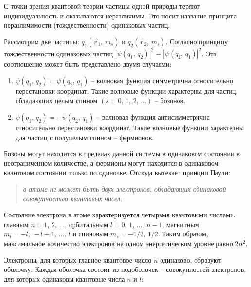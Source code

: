 
С точки зрения квантовой теории частицы одной природы теряют индивидуальность и
оказываются неразличимы. Это носит название принципа неразличимости
(тождественности) одинаковых частиц.

Рассмотрим две частицы: \( q_1(\vec{r}_1,\,m_s) \) и \( q_2(\vec{r}_2,\,
m_s) \). Согласно принципу тождественности одинаковых частиц
\( |\psi(q_1,\,q_2)|^2 = |\psi(q_2,\,q_1)|^2 \). Это соотношение может быть
представлено двумя случаями:
\begin{enumerate}
    \item \( \psi(q_1,\,q_2) = \psi(q_2,\,q_1) \) -- волновая функция
    симметрична относительно перестановки координат. Такие волновые функции
    характерны для частиц, обладающих целым спином \( (s = 0,\,1,\,2,\,\ldots)
    \) -- бозонов.
    
    \item \( \psi(q_1,\,q_2) = -\psi(q_2,\,q_1) \) -- волновая функция
    антисимметрична относительно перестановки координат. Такие волновые функции
    характерны для частиц с полуцелым спином -- фермионов.
\end{enumerate}

Бозоны могут находится в пределах данной системы в одинаковом состоянии в
неограниченном количестве, а фермионы могут находится в одинаковом квантовом
состоянии только по одиночке. Отсюда вытекает принцип Паули:

\begin{quote}
\emph{в атоме не может быть двух электронов, обладающих одинаковой
совокупностью квантовых чисел.}
\end{quote}

Состояние электрона в атоме характеризуется четырьмя квантовыми числами: главным
\( n = 1,\,2,\,\ldots \), орбитальным \( l = 0,\,1,\,\ldots,\,n - 1 \),
магнитным \( m_l = -l,\,-l + 1,\,\ldots,\, l \) и спиновым \( m_s = -1/2,\,
1/2 \). Таким образом, максимальное количество электронов на одном
энергетическом уровне равно \( 2n^2 \).

Электроны, для которых главное квантовое число \( n \) одинаково, образуют
оболочку. Каждая оболочка состоит из подоболочек -- совокупностей электронов,
для которых одинаковы квантовые числа \( n \) и \( l \):

